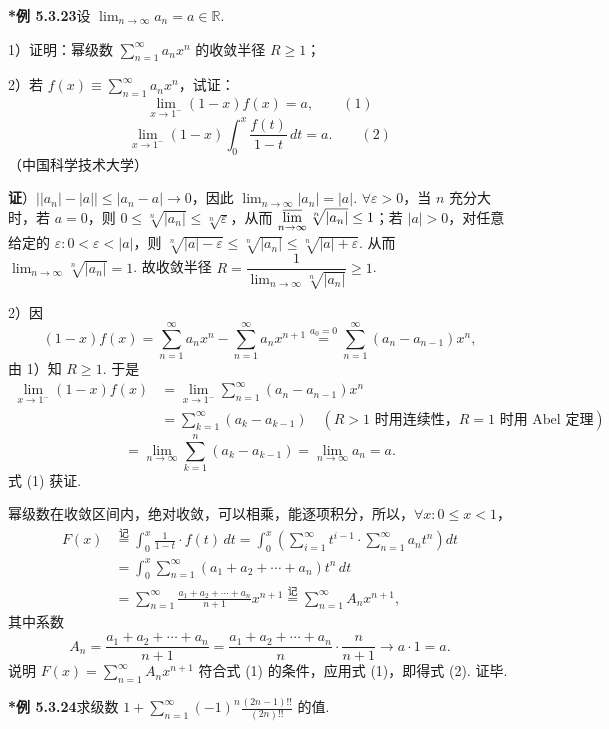 \documentclass[UTF8, 12pt, fontset=fandol, oneside]{ctexart}
\begin{document}
\noindent\textbf{*例 5.3.23}\quad 设 $\displaystyle\lim_{n\to\infty}a_n=a\in\mathbb R$.

1）证明：幂级数 $\displaystyle\sum_{n=1}^{\infty}a_nx^n$ 的收敛半径 $R\ge1$；

2）若 $f(x)\equiv\displaystyle\sum_{n=1}^{\infty}a_nx^n$，试证：
\[
  \lim_{x\to1^-}(1-x)f(x)=a, \qquad(1)
\]
\[
  \lim_{x\to1^-}(1-x)\int_0^x\frac{f(t)}{1-t}\,dt=a. \qquad(2)
\]
（中国科学技术大学）

\noindent\textbf{证}）$\big||a_n|-|a|\big|\le|a_n-a|\to0$，因此
$\displaystyle\lim_{n\to\infty}|a_n|=|a|$. $\forall\varepsilon>0$，当 $n$ 充分大时，若 $a=0$，则
$0\le\sqrt[n]{|a_n|}\le\sqrt[n]{\varepsilon}$，从而
$\displaystyle\varlimsup_{n\to\infty}\sqrt[n]{|a_n|}\le1$；若 $|a|>0$，对任意给定的
$\varepsilon:0<\varepsilon<|a|$，则
$\sqrt[n]{|a|-\varepsilon}\le\sqrt[n]{|a_n|}\le\sqrt[n]{|a|+\varepsilon}$. 从而
$\displaystyle\lim_{n\to\infty}\sqrt[n]{|a_n|}=1$. 故收敛半径
$R=\dfrac1{\displaystyle\lim_{n\to\infty}\sqrt[n]{|a_n|}}\ge1$.

2）因
\[
  (1-x)f(x)=\sum_{n=1}^{\infty}a_nx^n-\sum_{n=1}^{\infty}a_nx^{n+1}
  \overset{a_0=0}{=}\sum_{n=1}^{\infty}(a_n-a_{n-1})x^n,
\]
由 1）知 $R\ge1$. 于是
\[
\begin{aligned}
\lim_{x\to1^-}(1-x)f(x)
&=\lim_{x\to1^-}\sum_{n=1}^{\infty}(a_n-a_{n-1})x^n\\
&=\sum_{k=1}^{\infty}(a_k-a_{k-1})\quad(R>1\text{ 时用连续性，}R=1\text{ 时用 Abel 定理})
\end{aligned}
\]
\[
  =\lim_{n\to\infty}\sum_{k=1}^n(a_k-a_{k-1})=\lim_{n\to\infty}a_n=a.
\]
式 (1) 获证.

幂级数在收敛区间内，绝对收敛，可以相乘，能逐项积分，所以，$\forall x:0\le x<1$，
\[
\begin{aligned}
F(x)&\overset{\text{记}}{=}\int_0^x\frac1{1-t}\cdot f(t)\,dt
=\int_0^x\left(\sum_{i=1}^{\infty}t^{i-1}\cdot\sum_{n=1}^{\infty}a_nt^n\right)dt\\
&=\int_0^x\sum_{n=1}^{\infty}(a_1+a_2+\cdots+a_n)t^n\,dt\\
&=\sum_{n=1}^{\infty}\frac{a_1+a_2+\cdots+a_n}{n+1}x^{n+1}
\overset{\text{记}}{=}\sum_{n=1}^{\infty}A_nx^{n+1},
\end{aligned}
\]
其中系数
\[
  A_n=\frac{a_1+a_2+\cdots+a_n}{n+1}
  =\frac{a_1+a_2+\cdots+a_n}{n}\cdot\frac{n}{n+1}
  \to a\cdot1=a.
\]
说明 $\displaystyle F(x)=\sum_{n=1}^{\infty}A_nx^{n+1}$ 符合式 (1) 的条件，应用式 (1)，即得式 (2). 证毕.

\noindent\textbf{*例 5.3.24}\quad 求级数
$\displaystyle 1+\sum_{n=1}^{\infty}(-1)^n\frac{(2n-1)!!}{(2n)!!}$ 的值.
\end{document}
